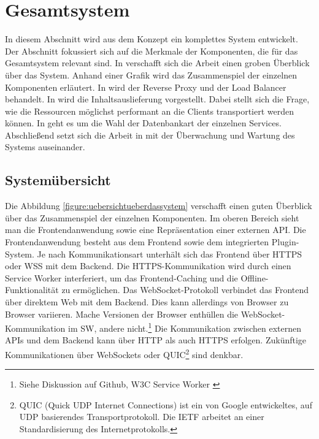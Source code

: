 \section{Gesamtsystem}
\label{sec:gesamtsysten}
In diesem Abschnitt wird aus dem Konzept ein komplettes System
entwickelt. Der Abschnitt fokussiert sich auf die Merkmale der Komponenten,
die für das Gesamtsystem relevant sind. In  verschafft
sich die Arbeit einen groben Überblick über das System. Anhand einer Grafik wird das Zusammenspiel
der einzelnen Komponenten erläutert. In  
wird der Reverse Proxy und der Load Balancer behandelt. In  wird
die Inhaltsauslieferung vorgestellt. Dabei stellt sich die Frage,
wie die Ressourcen möglichst performant an die Clients transportiert
werden können. In  geht es um die Wahl
der Datenbankart der einzelnen Services. Abschließend setzt sich die Arbeit
in  mit der Überwachung und Wartung
des Systems auseinander.

\subsection{Systemübersicht}
\label{subsec:systemuebersicht}
Die Abbildung \ref{figure:uebersichtueberdassystem} verschafft einen guten Überblick
über das Zusammenspiel der einzelnen Komponenten. Im oberen Bereich sieht man die
Frontendanwendung sowie eine Repräsentation einer externen API. Die Frontendanwendung
besteht aus dem Frontend sowie dem integrierten Plugin-System. Je nach Kommunikationsart
unterhält sich das Frontend über HTTPS oder WSS mit dem Backend. Die HTTPS-Kommunikation
wird durch einen Service Worker interferiert, um das Frontend-Caching und die
Offline-Funktionalität zu ermöglichen. Das WebSocket-Protokoll verbindet das Frontend
über direktem Web mit dem Backend. Dies kann allerdings von Browser zu Browser variieren.
Mache Versionen der Browser enthüllen die WebSocket-Kommunikation im SW, andere
nicht.\footnote{Siehe Diskussion auf Github, W3C Service Worker \cite{GithubIssueWebSocketExpose}}
Die Kommunikation zwischen externen APIs und dem Backend kann über HTTP als auch
HTTPS erfolgen. Zukünftige Kommunikationen über WebSockets oder QUIC\footnote{QUIC (Quick UDP Internet Connections) ist ein von Google entwickeltes, auf UDP basierendes Transportprotokoll.\cite{IETFQUICWhatsHappening} Die IETF arbeitet an einer Standardisierung des Internetprotokolls.\cite{DatatrakcerIETFQuic}}
sind denkbar.

